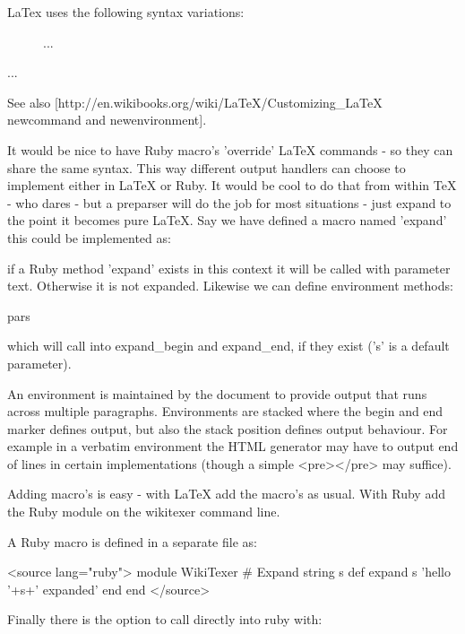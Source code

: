 LaTex uses the following syntax variations:

	\hfill
	\caption{This is the caption.\label{fig:rawss}}

  \begin{figure} ... \end{figure}
  \begin{minipage}[t]{0.58\linewidth} ... \end{minipage} %

See also [http://en.wikibooks.org/wiki/LaTeX/Customizing_LaTeX newcommand and newenvironment].

It would be nice to have Ruby macro's 'override' LaTeX commands - so
they can share the same syntax. This way different output handlers can
choose to implement either in LaTeX or Ruby. It would be cool to do
that from within TeX - who dares - but a preparser will do the job for
most situations - just expand to the point it becomes pure LaTeX. Say
we have defined a macro named 'expand' this could be implemented as:


if a Ruby method 'expand' exists in this context it will be called
with parameter text. Otherwise it is not expanded. Likewise we can 
define environment methods:

  \begin{expand}[s]{pars}
	\end{expand}

which will call into expand_begin and expand_end, if they exist ('s'
is a default parameter).

An environment is maintained by the document to provide output that
runs across multiple paragraphs. Environments are stacked where the
begin and end marker defines output, but also the stack position
defines output behaviour. For example in a verbatim environment the
HTML generator may have to output end of lines in certain
implementations (though a simple <pre></pre> may suffice).

Adding macro's is easy - with LaTeX add the macro's as usual. With
Ruby add the Ruby module on the wikitexer command line.

A Ruby macro is defined in a separate file as:

<source lang="ruby">
  module WikiTexer
		# Expand string s
		def expand s
			'hello '+s+' expanded'
		end
	end
</source>

Finally there is the option to call directly into ruby with:

